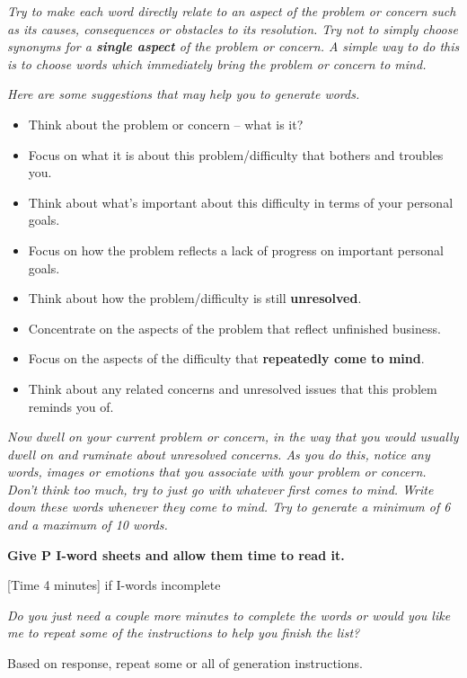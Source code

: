 \textit{Try to make each word directly relate to an aspect of the
problem or concern such as its causes, consequences or obstacles to
its resolution. Try not to simply choose synonyms for a \textbf{single
aspect} of the problem or concern. A simple way to do this is to choose
words which immediately bring the problem or concern to mind.}


\textit{ Here are some suggestions that  may help you to generate words.}

\begin{itemize}
\item {Think about the problem or concern -- what is it?}
\item {Focus on what it is about this problem/difficulty that bothers and troubles you.}
\item {Think about what's important about this difficulty in terms of your personal goals.}
\item {Focus on how the problem reflects a lack of progress on important personal goals.}
\item {Think about how the problem/difficulty is still \textbf{unresolved}.}
\item {Concentrate on the aspects of the problem that reflect unfinished business.}
\item {Focus on the aspects of the difficulty that \textbf{repeatedly come to mind}.}
\item {Think about any related concerns and unresolved issues that this problem reminds you of.}
\end{itemize}

\textit{Now dwell on your current problem or concern, in the way that
you would usually dwell on and ruminate about unresolved concerns. As
you do this, notice any words, images or emotions that you associate
with your problem or concern. Don't think too much, try to just go with
whatever first comes to mind. Write down these words whenever they come
to mind. Try to generate a minimum of 6 and a maximum of 10 words.}


\textbf{Give P I-word sheets and allow them time to read it.}

[\textcolor[rgb]{0.0,0.5019608,0.0}{Time 4 minutes}] if I-words incomplete

\textit{Do you just need a couple more minutes to complete the words or
would you like me to repeat some of the instructions to help you finish
the list?}

{Based on response, repeat some or all of generation instructions.}

